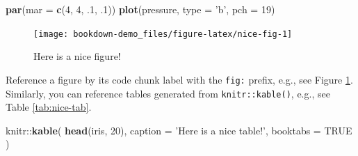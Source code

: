 \documentclass[]{book}
\newenvironment{Shaded}{\begin{snugshade}}{\end{snugshade}}
\newcommand{\KeywordTok}[1]{\textcolor[rgb]{0.13,0.29,0.53}{\textbf{{#1}}}}
\newcommand{\DataTypeTok}[1]{\textcolor[rgb]{0.13,0.29,0.53}{{#1}}}
\newcommand{\DecValTok}[1]{\textcolor[rgb]{0.00,0.00,0.81}{{#1}}}
\newcommand{\StringTok}[1]{\textcolor[rgb]{0.31,0.60,0.02}{{#1}}}
\newcommand{\OtherTok}[1]{\textcolor[rgb]{0.56,0.35,0.01}{{#1}}}
\newcommand{\NormalTok}[1]{{#1}}
\begin{document}
\begin{Shaded}
\begin{Highlighting}[]
\KeywordTok{par}\NormalTok{(}\DataTypeTok{mar =} \KeywordTok{c}\NormalTok{(}\DecValTok{4}\NormalTok{, }\DecValTok{4}\NormalTok{, .}\DecValTok{1}\NormalTok{, .}\DecValTok{1}\NormalTok{))}
\KeywordTok{plot}\NormalTok{(pressure, }\DataTypeTok{type =} \StringTok{'b'}\NormalTok{, }\DataTypeTok{pch =} \DecValTok{19}\NormalTok{)}
\end{Highlighting}
\end{Shaded}

\begin{figure}

{\centering \texttt{[image: bookdown-demo\_files/figure-latex/nice-fig-1]} 

}

\caption{Here is a nice figure!}\label{fig:nice-fig}
\end{figure}

Reference a figure by its code chunk label with the \texttt{fig:}
prefix, e.g., see Figure \ref{fig:nice-fig}. Similarly, you can
reference tables generated from \texttt{knitr::kable()}, e.g., see Table
\ref{tab:nice-tab}.

\begin{Shaded}
\begin{Highlighting}[]
\NormalTok{knitr::}\KeywordTok{kable}\NormalTok{(}
  \KeywordTok{head}\NormalTok{(iris, }\DecValTok{20}\NormalTok{), }\DataTypeTok{caption =} \StringTok{'Here is a nice table!'}\NormalTok{,}
  \DataTypeTok{booktabs =} \OtherTok{TRUE}
\NormalTok{)}
\end{Highlighting}
\end{Shaded}
\end{document}
